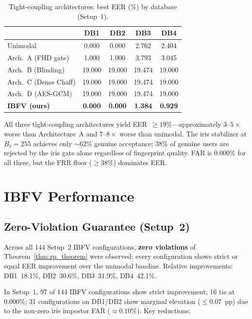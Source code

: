 \begin{table}[h]
\centering
\caption{Tight-coupling architectures: best EER (\%) by database (Setup~1).}
\label{tab:arch_bcd}
\small
\begin{tabular}{@{}l cccc@{}}
\toprule
 & \textbf{DB1} & \textbf{DB2} & \textbf{DB3} & \textbf{DB4} \\
\midrule
Unimodal              & 0.000  & 0.000  & 2.762  & 2.404  \\
Arch.~A (FHD gate)    & 1.000  & 1.000  & 3.793  & 3.045  \\
Arch.~B (Blinding)    & 19.000 & 19.000 & 19.474 & 19.000 \\
Arch.~C (Dense Chaff) & 19.000 & 19.000 & 19.474 & 19.000 \\
Arch.~D (AES-GCM)     & 19.000 & 19.000 & 19.474 & 19.000 \\
\textbf{IBFV (ours)}  & \textbf{0.000} & \textbf{0.000} & \textbf{1.384} & \textbf{0.929} \\
\bottomrule
\end{tabular}
\end{table}

All three tight-coupling architectures yield EER~$\geq 19\%$---approximately
$3$--$5\times$ worse than Architecture~A and $7$--$8\times$ worse than unimodal.
The iris stabilizer at $B_s = 255$ achieves only $\sim$62\% genuine acceptance;
38\% of genuine users are rejected by the iris gate alone regardless of fingerprint
quality. FAR is 0.000\% for all three, but the FRR floor ($\geq 38\%$) dominates EER.

\section{IBFV Performance}
\label{sec:ibfv_results}

\subsection{Zero-Violation Guarantee (Setup~2)}

Across all 144 Setup~2 IBFV configurations, \textbf{zero violations} of
Theorem~\ref{thm:zp_theorem} were observed: every configuration shows strict
or equal EER improvement over the unimodal baseline. Relative improvements:
DB1~18.1\%, DB2~30.6\%, DB3~31.9\%, DB4~42.1\%.

In Setup~1, 97 of 144 IBFV configurations show strict improvement; 16 tie at
0.000\%; 31 configurations on DB1/DB2 show marginal elevation ($\leq 0.07$~pp)
due to the non-zero iris impostor FAR ($\approx 0.10\%$). Key reductions:

